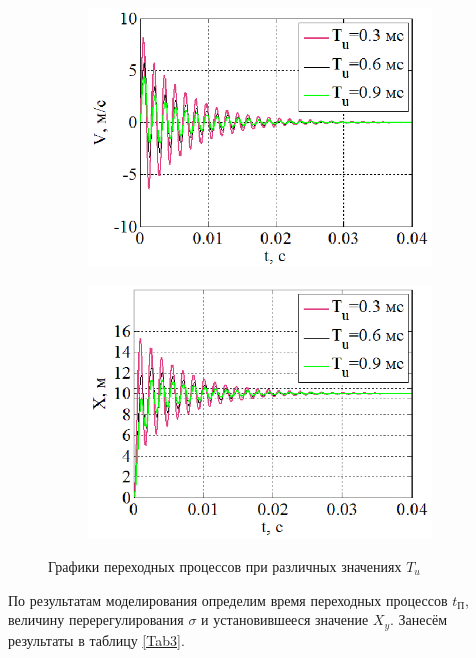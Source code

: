 \documentclass[a4paper,12pt]{article} %
\begin{document}
\begin{figure}[H]
\begin{subfigure}[b]{0.48\textwidth}
	\end{subfigure}
	\begin{subfigure}[b]{0.48\textwidth}
		\includegraphics[width = \textwidth]{scheme/V2}
	\end{subfigure}
	\hfill
	\begin{subfigure}[b]{0.48\textwidth}
		\includegraphics[width = \textwidth]{scheme/X2}
	\end{subfigure}
	\caption{Графики переходных процессов при различных значениях $T_u$}
	\label{UFVX2}
\end{figure}
По результатам моделирования определим время переходных процессов $t_\text{П}$, величину перерегулирования $\sigma$ и установившееся значение $X_y$. Занесём результаты в таблицу \ref{Tab3}.
\end{document}
